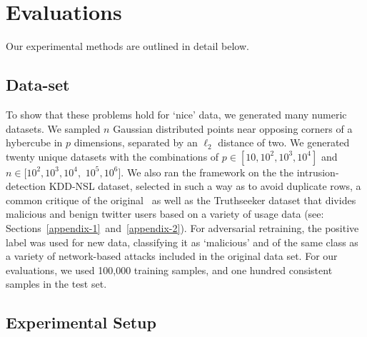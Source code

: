 \documentclass[runningheads]{llncs}
\begin{document}
\section{Evaluations}
Our experimental methods are outlined in detail below.
\subsection{Data-set}
To show that these problems hold for `nice' data, we generated many numeric datasets. We sampled $n$ Gaussian distributed points near opposing corners of a hybercube in $p$ dimensions, separated by an $\ell_2$ distance of two. We generated twenty unique datasets with the combinations of $p \in [10, 10^{2}, 10^{3}, 10^{4}]$ and $n \in [10^2, 10^3, 10^4,$ $10^5, 10^6]$. We also ran the framework on the the intrusion-detection KDD-NSL dataset\cite{kdd-nsl}, selected in such a way as to avoid duplicate rows, a common critique of the original~\cite{Dua:2019} as well as the Truthseeker dataset\cite{truthseeker} that divides malicious and benign twitter users based on a variety of usage data (see: Sections~\ref{appendix-1}~and~\ref{appendix-2}). For adversarial retraining, the positive label was used for new data, classifying it as `malicious' and of the same class as a variety of network-based attacks included in the original data set. For our evaluations, we used 100,000 training samples, and one hundred consistent samples in the test set. 




\subsection{Experimental Setup}
\end{document}

